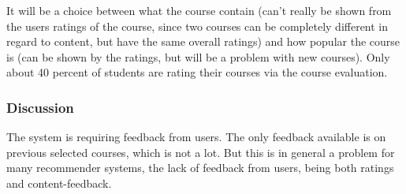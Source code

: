 It will be a choice between what the course contain (can't really be shown from the users ratings of the course, since two courses can be completely different in regard to content, but have the same overall ratings) and how popular the course is (can be shown by the ratings, but will be a problem with new courses). Only about 40 percent of students are rating their courses via the course evaluation.
\subsubsection{Discussion}
The system is requiring feedback from users. The only feedback available is on previous selected courses, which is not a lot. But this is in general a problem for many recommender systems, the lack of feedback from users, being both ratings and content-feedback. 
